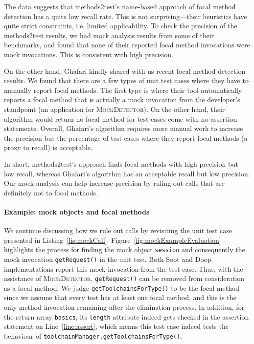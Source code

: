 The data suggests that methods2test's name-based approach of focal method detection has a quite low recall rate. This is not surprising---their heuristics have quite strict constraints, i.e. limited applicability. To check the precision of the methods2test results, we had mock analysis results from some of their benchmarks, and found that none of their reported focal method invocations were mock invocations. This is consistent with high precision.

On the other hand, Ghafari kindly shared with us recent focal method detection results. We found that there are a few types of unit test cases where they have to manually report focal methods. The first type is where their tool automatically reports a focal method that is actually a mock invocation from the developer's standpoint (an application for \textsc{MockDetector}). On the other hand, their algorithm would return no focal method for test cases come with no assertion statements. Overall, Ghafari's algorithm requires more manual work to increase the precision but the percentage of test cases where they report focal methods (a proxy to recall) is acceptable. 

In short, methods2test's approach finds focal methods with high precision but low recall, whereas Ghafari's algorithm has an acceptable recall but low precision. Our mock analysis can help increase precision by ruling out calls that are definitely not to focal methods.

\paragraph{Example: mock objects and focal methods} We continue discussing how we rule out calls by revisiting the unit test case presented in Listing~\ref{lis:mockCall}. Figure~\ref{fig:mockExampleEvaluation} highlights the process for finding the mock object \texttt{session} and consequently the mock invocation \texttt{getRequest()} in the unit test. Both Soot and Doop implementations report this mock invocation 
from the test case. Thus, with the assistance of \textsc{MockDetector}, \texttt{getRequest()} can be removed from consideration as a focal method. We judge \texttt{getToolchainsForType()} to be the focal method since we assume that every test has at least one focal method, and this is the only method invocation remaining after the elimination process. In addition, for the return array \texttt{basics}, its \texttt{length} attribute indeed gets checked in the assertion statement on Line~\ref{line:assert}, which means this test case indeed tests the behaviour of \texttt{toolchainManager.getToolchainsForType()}. 


